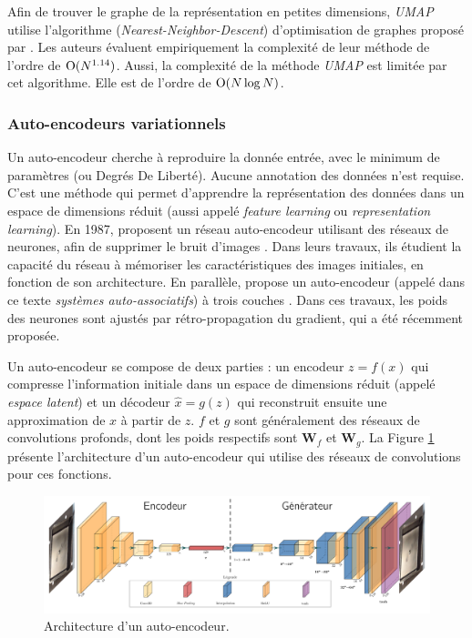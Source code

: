 Afin de trouver le graphe de la représentation en petites dimensions, \textit{UMAP} utilise l'algorithme (\textit{Nearest-Neighbor-Descent}) d'optimisation de graphes proposé par \citeauthor{dong_efficient_2011} \cite{dong_efficient_2011}.
Les auteurs évaluent empiriquement la complexité de leur méthode de l'ordre de $\operatorname{O}(N^{1.14})$.
Aussi, la complexité de la méthode \textit{UMAP} est limitée par cet algorithme.
Elle est de l'ordre de $\operatorname{O}(N \log N)$.


\subsubsection{Auto-encodeurs variationnels} \label{subsubsec:vae}
Un auto-encodeur cherche à reproduire la donnée entrée, avec le minimum de paramètres (ou Degrés De Liberté).
Aucune annotation des données n'est requise.
C'est une méthode qui permet d'apprendre la représentation des données dans un espace de dimensions réduit (aussi appelé \textit{feature learning} ou \textit{representation learning}).
En 1987, \citeauthor{lecun_modeles_1987, gallinari_memoires_1987} proposent un réseau auto-encodeur utilisant des réseaux de neurones, afin de supprimer le bruit d'images \cite{lecun_modeles_1987, gallinari_memoires_1987}.
Dans leurs travaux, ils étudient la capacité du réseau à mémoriser les caractéristiques des images initiales, en fonction de son architecture.
En parallèle, \citeauthor{ballard_modular_1987} propose un auto-encodeur (appelé dans ce texte \textit{systèmes auto-associatifs}) à trois couches \cite{ballard_modular_1987}.
Dans ces travaux, les poids des neurones sont ajustés par rétro-propagation du gradient, qui a été récemment proposée.

Un auto-encodeur se compose de deux parties : un encodeur $z = f(x)$ qui compresse l'information initiale dans un espace de dimensions réduit (appelé \textit{espace latent}) et un décodeur $\hat x = g(z)$ qui reconstruit ensuite une approximation de $x$ à partir de $z$.
$f$ et $g$ sont généralement des réseaux de convolutions profonds, dont les poids respectifs sont $\mathbf{W}_f$ et $\mathbf{W}_g$.
La Figure \ref{fig:autoencoder_architecture} présente l'architecture d'un auto-encodeur qui utilise des réseaux de convolutions pour ces fonctions.

\begin{figure}[hbtp]
	\centering
	\includegraphics[width=\textwidth,height=\textheight,keepaspectratio]{../Chap4/Figures/autoencoder_architecture.pdf}
	\caption{Architecture d'un auto-encodeur.}
	\label{fig:autoencoder_architecture}
\end{figure}

